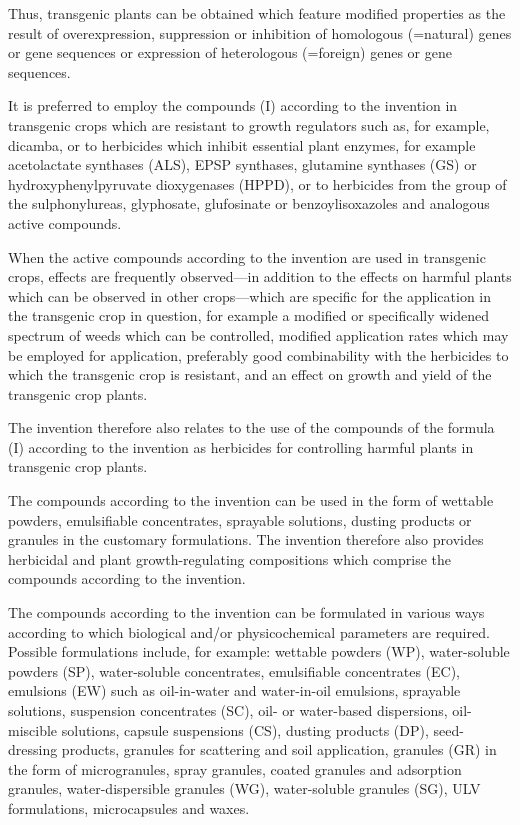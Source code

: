 \documentclass[11pt,a4paper]{article}
\begin{document}
Thus, transgenic plants can be obtained which feature modified properties as the result of overexpression, suppression or inhibition of homologous (=natural) genes or gene sequences or expression of heterologous (=foreign) genes or gene sequences.

It is preferred to employ the compounds (I) according to the invention in transgenic crops which are resistant to growth regulators such as, for example, dicamba, or to herbicides which inhibit essential plant enzymes, for example acetolactate synthases (ALS), EPSP synthases, glutamine synthases (GS) or hydroxyphenylpyruvate dioxygenases (HPPD), or to herbicides from the group of the sulphonylureas, glyphosate, glufosinate or benzoylisoxazoles and analogous active compounds.

When the active compounds according to the invention are used in transgenic crops, effects are frequently observed—in addition to the effects on harmful plants which can be observed in other crops—which are specific for the application in the transgenic crop in question, for example a modified or specifically widened spectrum of weeds which can be controlled, modified application rates which may be employed for application, preferably good combinability with the herbicides to which the transgenic crop is resistant, and an effect on growth and yield of the transgenic crop plants.

The invention therefore also relates to the use of the compounds of the formula (I) according to the invention as herbicides for controlling harmful plants in transgenic crop plants.

The compounds according to the invention can be used in the form of wettable powders, emulsifiable concentrates, sprayable solutions, dusting products or granules in the customary formulations. The invention therefore also provides herbicidal and plant growth-regulating compositions which comprise the compounds according to the invention.

The compounds according to the invention can be formulated in various ways according to which biological and/or physicochemical parameters are required. Possible formulations include, for example: wettable powders (WP), water-soluble powders (SP), water-soluble concentrates, emulsifiable concentrates (EC), emulsions (EW) such as oil-in-water and water-in-oil emulsions, sprayable solutions, suspension concentrates (SC), oil- or water-based dispersions, oil-miscible solutions, capsule suspensions (CS), dusting products (DP), seed-dressing products, granules for scattering and soil application, granules (GR) in the form of microgranules, spray granules, coated granules and adsorption granules, water-dispersible granules (WG), water-soluble granules (SG), ULV formulations, microcapsules and waxes.
\end{document}
